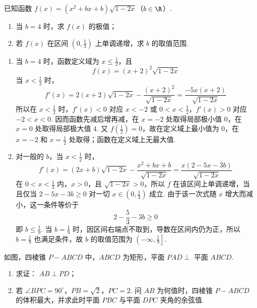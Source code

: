 \begin{problem}
已知函数 \( f(x) = (x^2 + bx + b)\sqrt{1 - 2x}  \)（\(b \in \R\)）.

\begin{enumerate}
\item 当 \( b = 4 \) 时，求 \( f(x) \) 的极值；
\item 若 \( f(x) \) 在区间 \( \left(0, \frac{1}{3}\right) \) 上单调递增，求 \( b \) 的取值范围.
\end{enumerate}
\end{problem}

\begin{solution}
\begin{enumerate}
\item 当 \(b=4\) 时，函数定义域为 \(x\leqslant\frac{1}{2}\)，且
\[
f(x)=(x+2)^2\sqrt{1-2x}
\]
当 \(x<\frac{1}{2}\) 时，
\[
f'(x)=2(x+2)\sqrt{1-2x}-\frac{(x+2)^2}{\sqrt{1-2x}}
=\frac{-5x(x+2)}{\sqrt{1-2x}}
\]
所以在 \(x<\frac{1}{2}\) 时，\(f'(x)<0\) 对应 \(x<-2\) 或 \(0<x<\frac{1}{2}\)，\(f'(x)>0\) 对应 \(-2<x<0\). 因而函数先减后增再减，在 \(x=-2\) 处取得局部极小值 \(0\)，在 \(x=0\) 处取得局部极大值 \(4\). 又 \(f\left(\frac{1}{2}\right)=0\)，故在定义域上最小值为 \(0\)，在 \(x=-2\) 和 \(x=\frac{1}{2}\) 处取得；函数在定义域上无最大值.

\item 对一般的 \(b\)，当 \(x<\frac{1}{2}\) 时，
\[
f'(x)=(2x+b)\sqrt{1-2x}-\frac{x^2+bx+b}{\sqrt{1-2x}}
=\frac{x(2-5x-3b)}{\sqrt{1-2x}}
\]
在 \(0<x<\frac{1}{3}\) 内，\(x>0\)，且 \(\sqrt{1-2x}>0\)，所以 \(f\) 在该区间上单调递增，当且仅当 \(2-5x-3b\geqslant 0\) 对一切 \(x\in\left(0,\frac{1}{3}\right)\) 成立. 由于该一次式随 \(x\) 增大而减小，这一条件等价于
\[
2-\frac{5}{3}-3b\geqslant 0
\]
即 \(b\leqslant\frac{1}{9}\). 当 \(b=\frac{1}{9}\) 时，因区间右端点不取到，导数在区间内仍为正，所以 \(b=\frac{1}{9}\) 也满足条件，故 \(b\) 的取值范围为 \(\left(-\infty,\frac{1}{9}\right]\).
\end{enumerate}
\end{solution}

\begin{problem}
如图，四棱锥 \(P - ABCD\) 中，\(ABCD\) 为矩形，平面 \(PAD \perp\) 平面 \(ABCD\).

\begin{enumerate}
\item 求证： \(AB \perp PD\)；
\item 若 \(\angle BPC = 90^{\circ}\)，\(PB = \sqrt{2}\)，\(PC = 2\). 问 \(AB\) 为何值时，四棱锥 \(P - ABCD\) 的体积最大，并求此时平面 \(PBC\) 与平面 \(DPC\) 夹角的余弦值.
\end{enumerate}
\end{problem}

